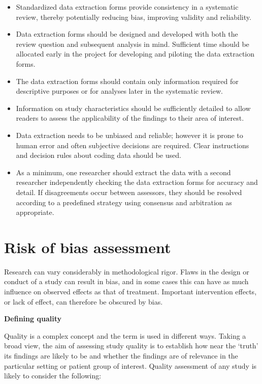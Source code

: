 \documentclass[
  11pt,
  a4paper,
  DIV=11,
  numbers=noendperiod]{scrreprt}
\begin{document}
\begin{itemize}
\item
  Standardized data extraction forms provide consistency in a systematic
  review, thereby potentially reducing bias, improving validity and
  reliability.
\item
  Data extraction forms should be designed and developed with both the
  review question and subsequent analysis in mind. Sufficient time
  should be allocated early in the project for developing and piloting
  the data extraction forms.
\item
  The data extraction forms should contain only information required for
  descriptive purposes or for analyses later in the systematic review.
\item
  Information on study characteristics should be sufficiently detailed
  to allow readers to assess the applicability of the findings to their
  area of interest.
\item
  Data extraction needs to be unbiased and reliable; however it is prone
  to human error and often subjective decisions are required. Clear
  instructions and decision rules about coding data should be used.
\item
  As a minimum, one researcher should extract the data with a second
  researcher independently checking the data extraction forms for
  accuracy and detail. If disagreements occur between assessors, they
  should be resolved according to a predefined strategy using consensus
  and arbitration as appropriate.
\end{itemize}

\section{Risk of bias assessment}\label{risk-of-bias-assessment-1}

Research can vary considerably in methodological rigor. Flaws in the
design or conduct of a study can result in bias, and in some cases this
can have as much influence on observed effects as that of treatment.
Important intervention effects, or lack of effect, can therefore be
obscured by bias.

\textbf{Defining quality}

Quality is a complex concept and the term is used in different ways.
Taking a broad view, the aim of assessing study quality is to establish
how near the `truth' its findings are likely to be and whether the
findings are of relevance in the particular setting or patient group of
interest. Quality assessment of any study is likely to consider the
following:
\end{document}
